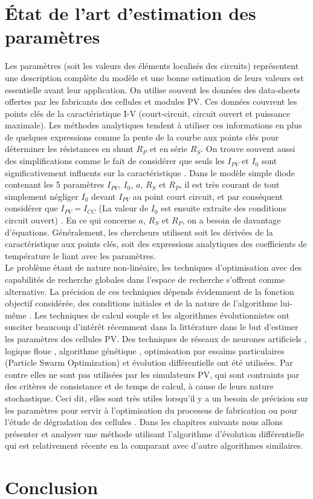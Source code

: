 \section{État de l'art d'estimation des paramètres}

Les paramètres (soit les valeurs des éléments localisés des circuits) représentent une description complète du modèle et une bonne estimation de leurs valeurs est essentielle avant leur application. On utilise souvent les données des data-sheets offertes par les fabricants des cellules et modules PV. Ces données couvrent les points clés de la caractéristique I-V (court-circuit, circuit ouvert et puissance maximale). Les méthodes analytiques tendent à utiliser ces informations en plus de quelques expressions comme la pente de la courbe aux points clés pour déterminer les résistances en shunt $R_P$ et en série $R_S$. On trouve souvent aussi des simplifications comme le fait de considérer que seuls les $I_{PV}$ et $I_0$ sont significativement influents sur la caractéristique \cite{Ciulla2014}.
Dans le modèle simple diode contenant les 5 paramètres $I_{PV}$, $I_0$, $a$, $R_S$ et $R_P$, il est très courant de tout simplement négliger $I_0$ devant $I_{PV}$ au point court circuit, et par conséquent considérer que $I_{PV} = I_{CC}$ (La valeur de $I_0$ est ensuite extraite des conditions circuit ouvert) \cite{Villalva2009,Ciulla2014,Tsai2008}. En ce qui concerne $a$, $R_S$ et $R_P$, on a besoin de davantage d'équations. Généralement, les chercheurs utilisent soit les dérivées de la caractéristique aux points clés, soit des expressions analytiques des coefficients de température le liant avec les paramètres.\\
Le problème étant de nature non-linéaire, les techniques d'optimisation avec des capabilités de recherche globales dans l'espace de recherche s'offrent comme alternative. La précision de ces techniques dépends évidemment de la fonction objectif considérée, des conditions initiales et de la nature de l'algorithme lui-même \cite{Easwarakhanthan1986, El-Naggar2012, DaCosta2010}. Les techniques de calcul souple et les algorithmes évolutionnistes ont susciter beaucoup d'intérêt récemment dans la littérature dans le but d'estimer les paramètres des cellules PV. Des techniques de réseaux de neurones artificiels \cite{Balzani2005, Zhang2005a, Karatepe2006}, logique floue \cite{Elhagry1997, Bendib2013, AbdulHadi2004}, algorithme génétique \cite{Jervase2001, Moldovan2009, Ismail2013}, optimisation par essaims particulaires (Particle Swarm Optimization) \cite{Ye2009, Soon2012} et évolution différentielle \cite{DaCosta2010, Ishaque2012, Gong2013} ont été utilisées. Par contre elles ne sont pas utilisées par les simulateurs PV, qui sont contraints par des critères de consistance et de temps de calcul, à cause de leurs nature stochastique. Ceci dit, elles sont très utiles lorsqu'il y a un besoin de précision sur les paramètres pour servir à l'optimisation du processus de fabrication ou pour l'étude de dégradation des cellules \cite{Ikegami2001,Balzani2005}. Dans les chapitres suivants nous allons présenter et analyser une méthode utilisant l'algorithme d'évolution différentielle qui est relativement récente en la comparant avec d'autre algorithmes similaires.

\section{Conclusion}
